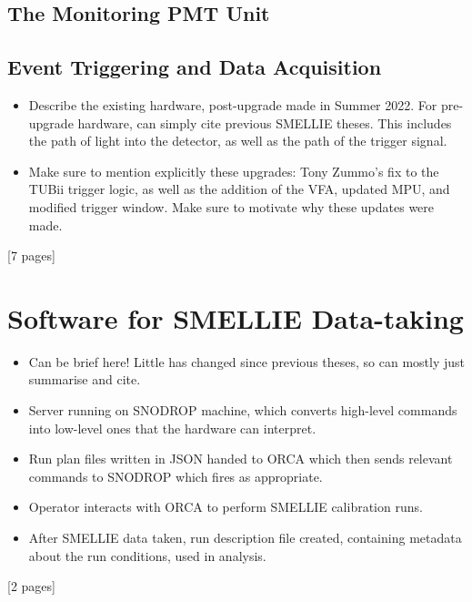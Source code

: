 \subsection{The Monitoring PMT Unit}\label{sec:smellie_mpu}

\subsection{Event Triggering and Data Acquisition}\label{sec:smellie_triggering_daq}


{
\color{blue}
\begin{itemize}
    \item Describe the existing hardware, post-upgrade made in Summer 2022. For pre-upgrade hardware, can simply cite previous SMELLIE theses. This includes the path of light into the detector, as well as the path of the trigger signal.
    \item Make sure to mention explicitly these upgrades: Tony Zummo's fix to the TUBii trigger logic, as well as the addition of the VFA, updated MPU, and modified trigger window. Make sure to motivate why these updates were made.
\end{itemize}
[7 pages]
\section{Software for SMELLIE Data-taking}
\begin{itemize}
    \item Can be brief here! Little has changed since previous theses, so can mostly just summarise and cite.
    \item Server running on SNODROP machine, which converts high-level commands into low-level ones that the hardware can interpret.
    \item Run plan files written in JSON handed to ORCA which then sends relevant commands to SNODROP which fires as appropriate.
    \item Operator interacts with ORCA to perform SMELLIE calibration runs.
    \item After SMELLIE data taken, run description file created, containing metadata about the run conditions, used in analysis.
\end{itemize}
[2 pages]
}
